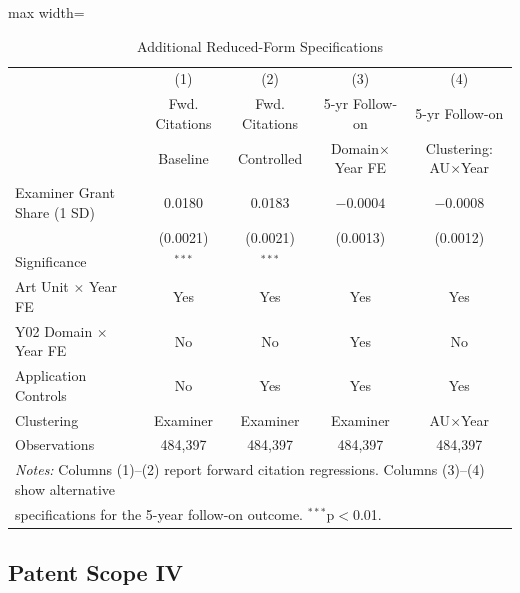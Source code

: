 \documentclass[12pt]{article}
\begin{document}
\begin{table}[htbp]
\centering
\caption{Additional Reduced-Form Specifications}
\label{tab:additional_rf}
\begin{adjustbox}{max width=\textwidth}
\begin{tabular}{lcccc}
\hline\hline
 & (1) & (2) & (3) & (4) \\
 & Fwd. Citations & Fwd. Citations & 5-yr Follow-on & 5-yr Follow-on \\
 & Baseline & Controlled & Domain$\times$Year FE & Clustering: AU$\times$Year \\
\hline
Examiner Grant Share (1 SD) & 0.0180 & 0.0183 & $-0.0004$ & $-0.0008$ \\
 & (0.0021) & (0.0021) & (0.0013) & (0.0012) \\
Significance & $^{***}$ & $^{***}$ & & \\
\hline
Art Unit $\times$ Year FE & Yes & Yes & Yes & Yes \\
Y02 Domain $\times$ Year FE & No & No & Yes & No \\
Application Controls & No & Yes & Yes & Yes \\
Clustering & Examiner & Examiner & Examiner & AU$\times$Year \\
Observations & 484,397 & 484,397 & 484,397 & 484,397 \\
\hline\hline
\multicolumn{5}{l}{\footnotesize\emph{Notes:} Columns (1)--(2) report forward citation regressions. Columns (3)--(4) show alternative} \\
\multicolumn{5}{l}{\footnotesize specifications for the 5-year follow-on outcome. $^{***}$p$<$0.01.} \\
\end{tabular}
\end{adjustbox}
\end{table}


\subsection{Patent Scope IV}
\label{app:iv}
\end{document}
